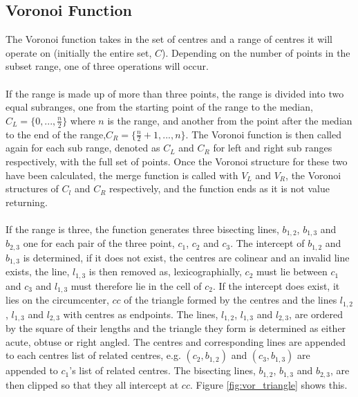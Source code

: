 \subsection{Voronoi Function}
The Voronoi function takes in the set of centres and a range of centres it will operate on (initially the entire set, $C$). Depending on the number of points in the subset range, one of three operations will occur.
\\
\\
If the range is made up of more than three points, the range is divided into two equal subranges, one from the starting point of the range to the median, $C_L = \{0,...,\frac{n}{2}\}$ where $n$ is the range, and another from the point after the median to the end of the range,$C_R = \{\frac{n}{2}+1,...,n\}$. The Voronoi function is then called again for each sub range, denoted as $C_L$ and $C_R$ for left and right sub ranges respectively, with the full set of points. Once the Voronoi structure for these two have been calculated, the merge function is called with $V_L$ and $V_R$, the Voronoi structures of $C_l$ and $C_R$ respectively, and the function ends as it is not value returning.
\\
\\
If the range is three, the function generates three bisecting lines, $b_{1,2}$, $b_{1,3}$ and $b_{2,3}$ one for each pair of the three point, $c_1$, $c_2$ and $c_3$. The intercept of $b_{1,2}$ and $b_{1,3}$ is determined, if it does not exist, the centres are colinear and an invalid line exists, the line, $l_{1,3}$ is then removed as, lexicographially, $c_2$ must lie between $c_1$ and $c_3$ and $l_{1,3}$ must therefore lie in the cell of $c_2$. If the intercept does exist, it lies on the circumcenter, $cc$ of the triangle formed by the centres and the lines $l_{1,2}$, $l_{1,3}$ and $l_{2,3}$ with centres as endpoints. The lines, $l_{1,2}$, $l_{1,3}$ and $l_{2,3}$, are ordered by the square of their lengths and the triangle they form is determined as either acute, obtuse or right angled. The centres and corresponding lines are appended to each centres list of related centres, e.g. $(c_2,b_{1,2})$ and $(c_3,b_{1,3})$ are appended to $c_1$'s list of related centres. The bisecting lines, $b_{1,2}$, $b_{1,3}$ and $b_{2,3}$, are then clipped so that they all intercept at $cc$. Figure \ref{fig:vor_triangle} shows this.
